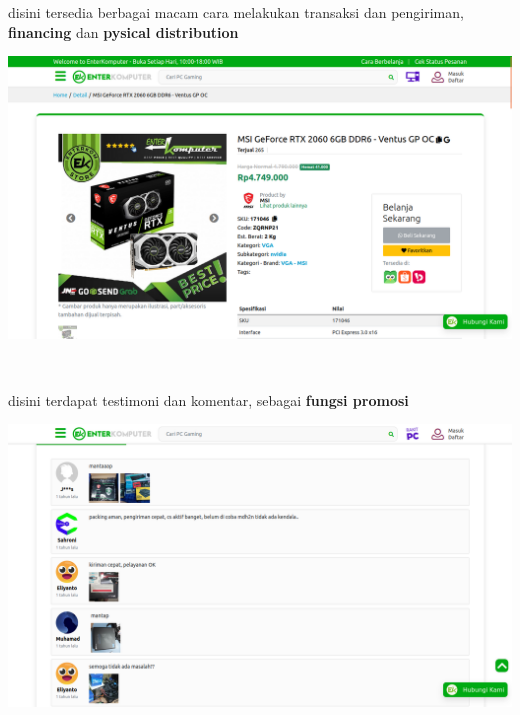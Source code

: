 \documentclass{article}
\begin{document}
\begin{minipage}{0.30\textwidth}
    disini tersedia berbagai macam cara melakukan transaksi dan pengiriman, \textbf{financing} dan \textbf{pysical distribution}
\end{minipage}
\hspace*{0.04\textwidth}
\begin{minipage}{0.65\textwidth}
    \includegraphics[width=\textwidth]{file-19.png}
\end{minipage}
\\
\begin{minipage}{0.30\textwidth}
    disini terdapat testimoni dan komentar, sebagai \textbf{fungsi promosi}
\end{minipage}
\hspace*{0.04\textwidth}
\begin{minipage}{0.65\textwidth}
    \includegraphics[width=\textwidth]{file-35.png}
\end{minipage}
\end{document}
